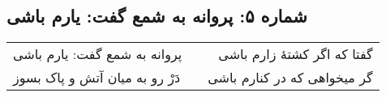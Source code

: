 \begin{center}
\section*{شماره ۵: پروانه به شمع گفت: یارم باشی}
\label{sec:005}
\begin{longtable}{l p{0.5cm} r}
پروانه به شمع گفت: یارم باشی
&&
گفتا که اگر کشتهٔ زارم باشی
\\
دَرْ رو به میان آتش و پاک بسوز
&&
گر میخواهی که در کنارم باشی
\\
\end{longtable}
\end{center}
